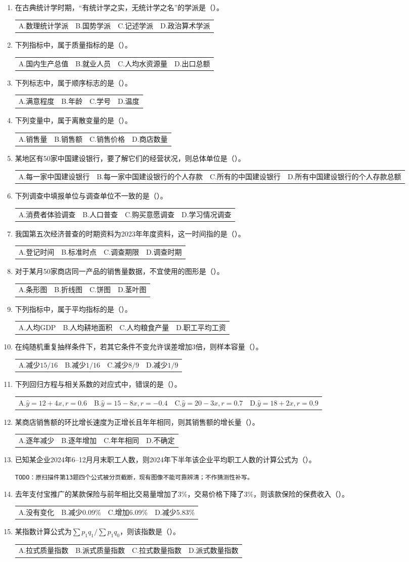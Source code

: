 \documentclass[UTF8,a4paper,10pt]{ctexart}
\makeatletter
\newcommand{\opts}[1]{\par\hspace*{.5em}\begin{tabularx}{\dimexpr\linewidth-.5em}{@{}XXXX@{}}#1\end{tabularx}\par}
\makeatother
\begin{document}
\begin{enumerate}
\item 在古典统计学时期，“有统计学之实，无统计学之名”的学派是（）。\opts{A.数理统计学派&B.国势学派&C.记述学派&D.政治算术学派}
\item 下列指标中，属于质量指标的是（）。\opts{A.国内生产总值&B.就业人员&C.人均水资源量&D.出口总额}
\item 下列标志中，属于顺序标志的是（）。\opts{A.满意程度&B.年龄&C.学号&D.温度}
\item 下列变量中，属于离散变量的是（）。\opts{A.销售量&B.销售额&C.销售价格&D.商店数量}
\item 某地区有50家中国建设银行，要了解它们的经营状况，则总体单位是（）。\opts{A.每一家中国建设银行&B.每一家中国建设银行的个人存款&C.所有的中国建设银行&D.所有中国建设银行的个人存款总额}
\item 下列调查中填报单位与调查单位不一致的是（）。\opts{A.消费者体验调查&B.人口普查&C.购买意愿调查&D.学习情况调查}
\item 我国第五次经济普查的时期资料为2023年年度资料，这一时间指的是（）。\opts{A.登记时间&B.标准时点&C.调查期限&D.调查时期}
\item 对于某月50家商店同一产品的销售量数据，不宜使用的图形是（）。\opts{A.条形图&B.折线图&C.饼图&D.茎叶图}
\item 下列指标中，属于平均指标的是（）。\opts{A.人均GDP&B.人均耕地面积&C.人均粮食产量&D.职工平均工资}
\item 在纯随机重复抽样条件下，若其它条件不变允许误差增加3倍，则样本容量（）。\opts{A.减少$15/16$&B.减少$1/16$&C.减少$8/9$&D.减少$1/9$}
\item 下列回归方程与相关系数的对应式中，错误的是（）。\opts{A.$\hat y=12+4x,r=0.6$&B.$\hat y=15-8x,r=-0.4$&C.$\hat y=20-3x,r=0.7$&D.$\hat y=18+2x,r=0.9$}
\item 某商店销售额的环比增长速度为正增长且年年相同，则其销售额的增长量（）。\opts{A.逐年减少&B.逐年增加&C.年年相同&D.不确定}
\item 已知某企业2024年6--12月月末职工人数，则2024年下半年该企业平均职工人数的计算公式为（）。\par\noindent\texttt{TODO：原扫描件第13题四个公式被分页截断，现有图像不能可靠辨清；不作猜测性补写。}
\item 去年支付宝推广的某款保险与前年相比交易量增加了3\%，交易价格下降了3\%，则该款保险的保费收入（）。\opts{A.没有变化&B.减少0.09\%&C.增加6.09\%&D.减少5.83\%}
\item 某指数计算公式为$\sum p_1q_1/\sum p_1q_0$，则该指数是（）。\opts{A.拉式质量指数&B.派式质量指数&C.拉式数量指数&D.派式数量指数}
\end{enumerate}
\end{document}
